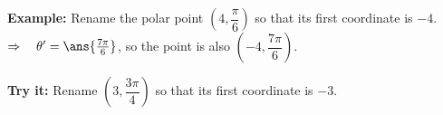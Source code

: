 \documentclass[12pt]{article}
\begin{document}
\begin{examplebox}
\textbf{Example:} \quad Rename the polar point $\left(4, \dfrac{\pi}{6}\right)$ so that its first coordinate is $-4$.
$\Rightarrow\quad \theta' = \ans{\tfrac{7\pi}{6}}$, so the point is also $\left(-4, \dfrac{7\pi}{6}\right)$.
\end{examplebox}

\begin{tryitbox}
\textbf{Try it:} \quad Rename $\left(3, \dfrac{3\pi}{4}\right)$ so that its first coordinate is $-3$.\\[2pt]
\end{tryitbox}
\end{document}
